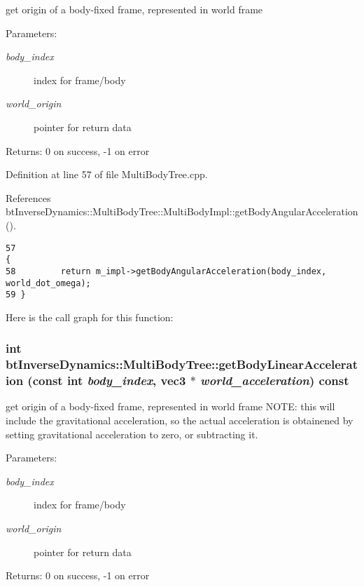 get origin of a body-fixed frame, represented in world frame \begin{Desc}
\item[Parameters:]
\begin{description}
\item[{\em body\_\-index}]index for frame/body \item[{\em world\_\-origin}]pointer for return data \end{description}
\end{Desc}
\begin{Desc}
\item[Returns:]0 on success, -1 on error \end{Desc}


Definition at line 57 of file MultiBodyTree.cpp.

References btInverseDynamics::MultiBodyTree::MultiBodyImpl::getBodyAngularAcceleration().

\begin{Code}\begin{verbatim}57                                                                                                {
58         return m_impl->getBodyAngularAcceleration(body_index, world_dot_omega);
59 }
\end{verbatim}
\end{Code}




Here is the call graph for this function:\hypertarget{classbt_inverse_dynamics_1_1_multi_body_tree_07aeba9ee7505e1c2a4c8a5f317bcf22}{
\subsubsection[getBodyLinearAcceleration]{\setlength{\rightskip}{0pt plus 5cm}int btInverseDynamics::MultiBodyTree::getBodyLinearAcceleration (const int {\em body\_\-index}, \/  {\bf vec3} $\ast$ {\em world\_\-acceleration}) const}}
\label{classbt_inverse_dynamics_1_1_multi_body_tree_07aeba9ee7505e1c2a4c8a5f317bcf22}


get origin of a body-fixed frame, represented in world frame NOTE: this will include the gravitational acceleration, so the actual acceleration is obtainened by setting gravitational acceleration to zero, or subtracting it. \begin{Desc}
\item[Parameters:]
\begin{description}
\item[{\em body\_\-index}]index for frame/body \item[{\em world\_\-origin}]pointer for return data \end{description}
\end{Desc}
\begin{Desc}
\item[Returns:]0 on success, -1 on error \end{Desc}


